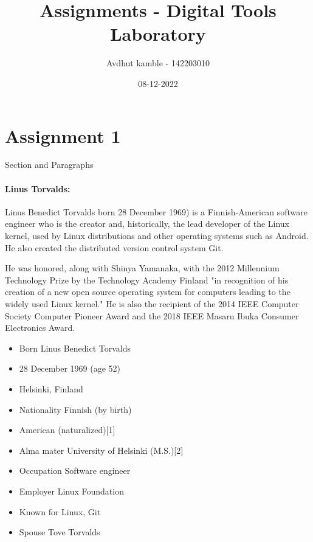 \documentclass{article}
\title{Assignments - Digital Tools Laboratory}
\date{08-12-2022}
\author{Avdhut kamble - 142203010}
\begin{document}
	
	\maketitle
	\newpage
	\tableofcontents
	\newpage
	
	\section{Assignment 1}
	Section and Paragraphs
	
	\paragraph{Linus Torvalds:}
	Linus Benedict Torvalds born 28 December 1969) is a Finnish-American software engineer who is the creator and, historically, the lead developer of the Linux kernel, used by Linux distributions and other operating systems such as Android. He also created the distributed version control system Git.
	
	He was honored, along with Shinya Yamanaka, with the 2012 Millennium Technology Prize by the Technology Academy Finland "in recognition of his creation of a new open source operating system for computers leading to the widely used Linux kernel." He is also the recipient of the 2014 IEEE Computer Society Computer Pioneer Award and the 2018 IEEE Masaru Ibuka Consumer Electronics Award.
		
	\begin{itemize}
		\item Born	Linus Benedict Torvalds
		\item 28 December 1969 (age 52)
		\item Helsinki, Finland
		\item Nationality	Finnish (by birth)
		\item American (naturalized)[1]
		\item Alma mater	University of Helsinki (M.S.)[2]
		\item Occupation	Software engineer
		\item Employer	Linux Foundation
		\item Known for	Linux, Git
		\item Spouse	Tove Torvalds
		
	\end{itemize}	

	
	
	
\end{document}
